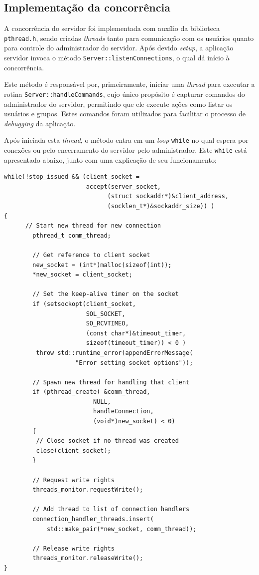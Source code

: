 \documentclass{article}
\begin{document}
\subsection{Implementação da concorrência}
A concorrência do servidor foi implementada com auxílio da biblioteca \texttt{pthread.h}, sendo criadas \textit{threads} tanto para comunicação com os usuários quanto para controle do administrador do servidor. Após devido \textit{setup}, a aplicação servidor invoca o método \texttt{Server::listenConnections}, o qual dá início à concorrência.
\par Este método é responsável por, primeiramente, iniciar uma \textit{thread} para executar a rotina \texttt{Server::handleCommands}, cujo único propósito é capturar comandos do administrador do servidor, permitindo que ele execute ações como listar os usuários e grupos. Estes comandos foram utilizados para facilitar o processo de \textit{debugging} da aplicação.
\par Após iniciada esta \textit{thread}, o método entra em um \textit{loop} \texttt{while} no qual espera por conexões ou pelo encerramento do servidor pelo administrador. Este \texttt{while} está apresentado abaixo, junto com uma explicação de seu funcionamento;
\\
\begin{lstlisting}[xleftmargin=-.05\textwidth, xrightmargin=-.05\textwidth]
while(!stop_issued && (client_socket = 
                       accept(server_socket, 
                             (struct sockaddr*)&client_address, 
                             (socklen_t*)&sockaddr_size)) )
{
      // Start new thread for new connection
        pthread_t comm_thread;
        
        // Get reference to client socket
        new_socket = (int*)malloc(sizeof(int));
        *new_socket = client_socket;
        
        // Set the keep-alive timer on the socket
        if (setsockopt(client_socket, 
                       SOL_SOCKET, 
                       SO_RCVTIMEO, 
                       (const char*)&timeout_timer, 
                       sizeof(timeout_timer)) < 0 )
         throw std::runtime_error(appendErrorMessage(
                    "Error setting socket options"));
        
        // Spawn new thread for handling that client
        if (pthread_create( &comm_thread, 
                         NULL, 
                         handleConnection, 
                         (void*)new_socket) < 0)
        {
         // Close socket if no thread was created
         close(client_socket);
        }
        
        // Request write rights
        threads_monitor.requestWrite();
        
        // Add thread to list of connection handlers
        connection_handler_threads.insert(
            std::make_pair(*new_socket, comm_thread));
        
        // Release write rights
        threads_monitor.releaseWrite();
}
\end{lstlisting}
\end{document}
